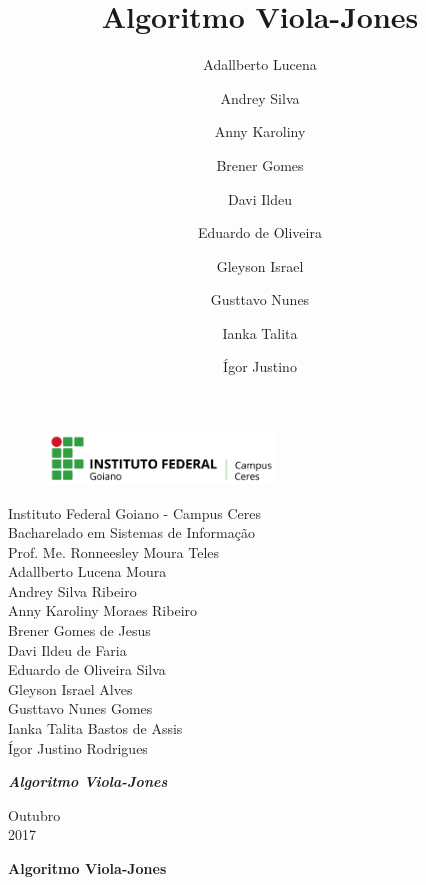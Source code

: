 \documentclass[12pt,a4paper]{article}
\title{Algoritmo Viola-Jones}
\author{Adallberto Lucena \and Andrey Silva \and Anny Karoliny \and Brener Gomes \and Davi Ildeu \and Eduardo de Oliveira \and Gleyson Israel \and Gusttavo Nunes \and Ianka Talita \and Ígor Justino}
\begin{document}
\begin{titlepage}


\begin{center}
\begin{figure}[htb]
		
		\label{figura:LogoIF}
	
		\centering
		\includegraphics[width=6cm]{logo.png} 
\end{figure}


Instituto Federal Goiano - Campus Ceres\\
Bacharelado em Sistemas de Informação\\
Prof. Me. Ronneesley Moura Teles\\\vspace{0.5cm}
Adallberto Lucena Moura \\
Andrey Silva Ribeiro\\
Anny Karoliny Moraes Ribeiro \\
Brener Gomes de Jesus\\
Davi Ildeu de Faria\\
Eduardo de Oliveira Silva\\
Gleyson Israel Alves\\
Gusttavo Nunes Gomes\\
Ianka Talita Bastos de Assis\\
Ígor Justino Rodrigues\\



\vspace{5.0cm}

\textit{\textbf{\Large{Algoritmo Viola-Jones}}}\\\vspace{0.5cm}
\vspace{9.5cm}

Outubro\\
2017\\
\end{center}
\end{titlepage}



\tableofcontents

\newpage
\begin{center}
\textbf{\Large{Algoritmo Viola-Jones}}\\\vspace{0.5cm}
\end{center}
\end{document}
